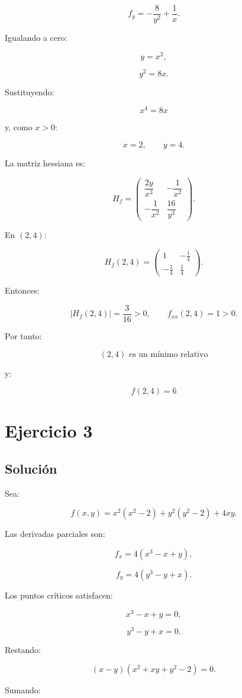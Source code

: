 \documentclass[11pt,a4paper]{article}
\begin{document}
\[
f_y=-\frac8{y^2}+\frac1x.
\]

Igualando a cero:

\[
y=x^2,
\]

\[
y^2=8x.
\]

Sustituyendo:

\[
x^4=8x
\]

y, como \(x>0\):

\[
x=2,
\qquad
y=4.
\]

La matriz hessiana es:

\[
H_f=
\begin{pmatrix}
\dfrac{2y}{x^3}&-\dfrac1{x^2}\\[2mm]
-\dfrac1{x^2}&\dfrac{16}{y^3}
\end{pmatrix}.
\]

En \((2,4)\):

\[
H_f(2,4)=
\begin{pmatrix}
1&-\frac14\\[1mm]
-\frac14&\frac14
\end{pmatrix}.
\]

Entonces:

\[
|H_f(2,4)|
=
\frac3{16}>0,
\qquad
f_{xx}(2,4)=1>0.
\]

Por tanto:

\[
\boxed{
(2,4)\text{ es un mínimo relativo}
}
\]

y:

\[
\boxed{
f(2,4)=6
}
\]

\section{Ejercicio 3}
\subsection{Solución}

Sea:

\[
f(x,y)
=
x^2(x^2-2)+y^2(y^2-2)+4xy.
\]

Las derivadas parciales son:

\[
f_x
=
4(x^3-x+y),
\]

\[
f_y
=
4(y^3-y+x).
\]

Los puntos críticos satisfacen:

\[
x^3-x+y=0,
\]

\[
y^3-y+x=0.
\]

Restando:

\[
(x-y)(x^2+xy+y^2-2)=0.
\]

Sumando:
\end{document}
